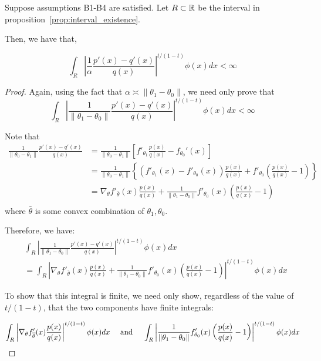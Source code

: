 \begin{proposition}
\label{prop:theta_A4_bound}
Suppose assumptions B1-B4 are satisfied. Let $R \subset {\mathbb R}$ be the interval in proposition~\ref{prop:interval_existence}.

Then, we have that,

\[
\int_R \left| \frac{1}{\alpha} \frac{p'(x) - q'(x)}{q(x)} \right|^{t/(1-t)} \phi(x) dx < \infty
\]

\end{proposition}

\begin{proof}

Again, using the fact that $\alpha \asymp \| \theta_1 - \theta_0 \|$, we need only prove that
\[
\int_R \left| \frac{1}{\| \theta_1 - \theta_0\| } \frac{p'(x) - q'(x)}{q(x)} \right|^{t/(1-t)} \phi(x) dx < \infty
\]


Note that
\begin{align*}
\frac{1}{\| \theta_0 - \theta_1 \|} \frac{p'(x) - q'(x)}{q(x)}& = 
   \frac{1}{\| \theta_0 - \theta_1 \|} \left[
           f'_{\theta_1} \frac{p(x)}{q(x)} - f_{\theta_0}'(x) \right] \\
  &= \frac{1}{\|\theta_0 - \theta_1\|} \left\{ 
          ( f'_{\theta_1}(x) - f'_{\theta_0}(x) ) \frac{p(x)}{q(x)} 
       + f'_{\theta_0} \left( \frac{p(x)}{q(x)} - 1 \right) \right\} \\
  &= \nabla_{\theta} f'_{\bar{\theta}}(x) \frac{p(x)}{q(x)} 
         + \frac{1}{\| \theta_1 - \theta_0\|} f'_{\theta_0}(x) \left( \frac{p(x)}{q(x)} - 1 \right) \\
\end{align*}
where $\bar{\theta}$ is some convex combination of $\theta_1, \theta_0$. 

Therefore, we have:
\begin{align*}
& \int_R \left| \frac{1}{\| \theta_1 - \theta_0\| } \frac{p'(x) - q'(x)}{q(x)} \right|^{t/(1-t)} \phi(x) dx \\
& =  \int_R \left|  \nabla_{\theta} f'_{\bar{\theta}}(x) \frac{p(x)}{q(x)} 
         + \frac{1}{\| \theta_1 - \theta_0\|} f'_{\theta_0}(x) \left( \frac{p(x)}{q(x)} - 1 \right)  \right|^{t/(1-t)} \phi(x)dx
\end{align*}


To show that this integral is finite, we need only show, regardless of the value of $t/(1-t)$, that the two components have finite integrals:

\[
 \int_R \left|  \nabla_{\theta} f'_{\overline{\theta}}(x) \frac{p(x)}{q(x)} \right|^{t/(1-t)} \phi(x) dx \quad \textrm{ and } \quad
         \int_R \left| \frac{1}{\| \theta_1 - \theta_0\|} f'_{\theta_0}(x) \left( \frac{p(x)}{q(x)} - 1 \right)  \right|^{t/(1-t)} \phi(x)dx
\]



\end{proof}
